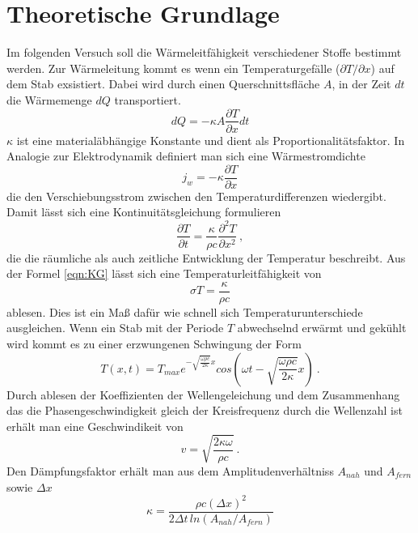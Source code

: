 \section{Theoretische Grundlage}
\label{sec:Theorie}
Im folgenden Versuch soll die Wärmeleitfähigkeit verschiedener Stoffe bestimmt werden. Zur Wärmeleitung kommt es wenn ein Temperaturgefälle ($\partial T / \partial x$) auf dem Stab exsistiert. Dabei wird durch einen Querschnittsfläche $A$, in der Zeit $dt$ die Wärmemenge $dQ$ transportiert.
\begin{equation}
	\label{eqn:Q/t}
	dQ = - \kappa A \frac{\partial T}{\partial x} dt
\end{equation}
$\kappa$ ist eine materialäbhängige Konstante und dient als Proportionalitätsfaktor. In Analogie zur Elektrodynamik definiert man sich eine Wärmestromdichte 
\begin{equation}
	j_w = - \kappa \frac{\partial T}{\partial x}
\end{equation}
die den Verschiebungsstrom zwischen den Temperaturdifferenzen wiedergibt. Damit lässt sich eine Kontinuitätsgleichung formulieren
\begin{equation}
	\label{eqn:KG}
	\frac{\partial T}{\partial t} = \frac{\kappa}{\rho c} \frac{\partial^2 T}{\partial x^2} \ ,
\end{equation}
die die räumliche als auch zeitliche Entwicklung der Temperatur beschreibt. Aus der Formel \ref{eqn:KG} lässt sich eine Temperaturleitfähigkeit von
\begin{equation}
	\sigma T = \frac{\kappa}{\rho c}
\end{equation}
ablesen. Dies ist ein Maß dafür wie schnell sich Temperaturunterschiede ausgleichen. Wenn ein Stab mit der Periode $T$ abwechselnd erwärmt und gekühlt wird kommt es zu einer erzwungenen Schwingung der Form 
\begin{equation}
	T(x,t) = T_{max}e^{-\sqrt{\frac{\omega \rho c}{2 \kappa}}x}cos \left( \omega t - \sqrt{ \frac{\omega \rho c}{2 \kappa}}x \right) \ .
\end{equation}
Durch ablesen der Koeffizienten der Wellengeleichung und dem Zusammenhang das die Phasengeschwindigkeit gleich der Kreisfrequenz durch die Wellenzahl ist erhält man eine Geschwindikeit von
\begin{equation}
	\label{eqn:v}
	v = \sqrt{ \frac{2 \kappa \omega}{\rho c}} \ .
\end{equation}
Den Dämpfungsfaktor erhält man aus dem Amplitudenverhältniss $A_{nah}$ und $A_{fern}$ sowie $\Delta x$
\begin{equation}
	\label{eqn:kappa}
	\kappa = \frac{\rho c (\Delta x)^2}{2 \Delta t \, ln(A_{nah}/A_{fern})}
\end{equation}

